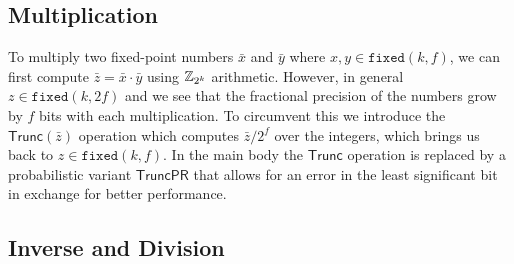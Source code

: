 \subsection{Multiplication}
To multiply two fixed-point numbers $\bar{x}$ and $\bar{y}$ where $x, y \in
\mathtt{fixed}(k, f)$, we can first compute $\bar{z} = \bar{x} \cdot \bar{y}$
using $\mathbb{Z}_{2^k}$ arithmetic. However, in general $z \in \mathtt{fixed}(k,
2f)$ and we see that the fractional precision of the numbers grow by $f$ bits
with each multiplication. To circumvent this we introduce the
$\mathsf{Trunc}(\bar{z})$ operation which computes $\bar{z} / 2^{f}$ over the
integers, which brings us back to $z \in \mathtt{fixed}(k, f)$. In the main
body the $\mathsf{Trunc}$ operation is replaced by a probabilistic variant
$\mathsf{TruncPR}$ that allows for an error in the least significant bit in
exchange for better performance.






\subsection{Inverse and Division}


